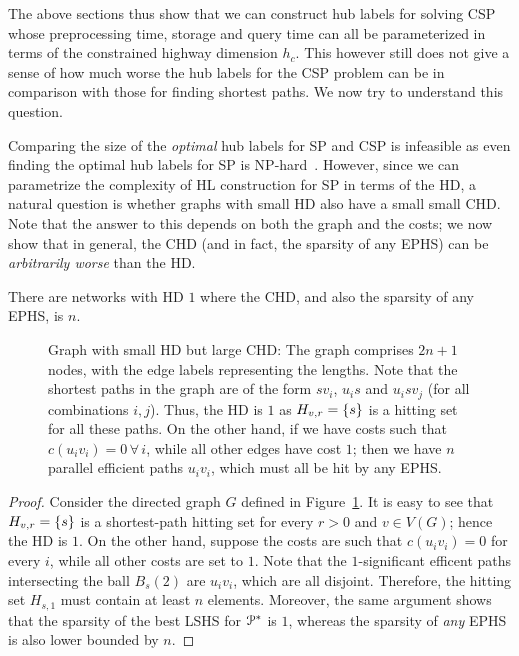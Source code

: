 The above sections thus show that we can construct hub labels for solving CSP whose preprocessing time, storage and query time can all be parameterized in terms of the constrained highway dimension $h_c$. 
This however still does not give a sense of how much worse the hub labels for the CSP problem can be in comparison with those for finding shortest paths. 
We now try to understand this question.

Comparing the size of the \emph{optimal} hub labels for SP and CSP is infeasible as even finding the optimal hub labels for SP is NP-hard~\cite{babenko_hl_complexity}. However, since we can parametrize the complexity of HL construction for SP in terms of the HD, a natural question is whether graphs with small HD also have a small small CHD. Note that the answer to this depends on both the graph and the costs; we now show that in general, the CHD (and in fact, the sparsity of any EPHS) can be \emph{arbitrarily worse} than the HD. 
\begin{proposition}
There are networks with HD $1$ where the CHD, and also the sparsity of any EPHS, is $n$.
\end{proposition}

\begin{figure}

\caption{Graph with small HD but large CHD: The graph comprises $2n+1$ nodes, with the edge labels representing the lengths. Note that the shortest paths in the graph are of the form $sv_i$, $u_is$ and $u_isv_j$ (for all combinations $i,j$). Thus, the HD is $1$ as $H_{v,r}=\{s\}$ is a hitting set for all these paths. On the other hand, if we have costs such that $c(u_iv_i)=0\,\forall\,i$, while all other edges have cost $1$; then we have $n$ parallel efficient paths $u_iv_i$, which must all be hit by any EPHS.}
\label{fig:big_chd}
\end{figure}

\begin{proof}
Consider the directed graph $G$ defined in Figure~\ref{fig:big_chd}.
It is easy to see that $H_{v,r}=\{s\}$ is a shortest-path hitting set for every $r>0$ and $v\in V(G)$; hence the HD is $1$.
On the other hand, suppose the costs are such that $c(u_iv_i)=0$ for every $i$, while all other costs are set to $1$.
Note that the $1$-significant efficent paths intersecting the ball $B_s(2)$ are $u_iv_i$, which are all disjoint.
Therefore, the hitting set $H_{s,1}$ must contain at least $n$ elements. Moreover, the same argument shows that the sparsity of the best LSHS for $\mathcal{P}^*$ is $1$, whereas the sparsity of \emph{any} EPHS is also lower bounded by $n$.
\end{proof}

